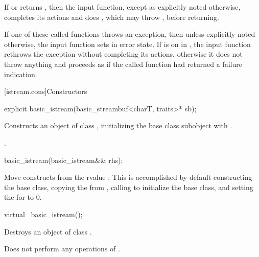 \pnum
If
or
returns
,
then the input function, except as explicitly noted otherwise, completes its actions and does
,
which may throw
, before returning.

\pnum
If one of these called functions throws an exception, then unless explicitly noted otherwise,
the input function sets
in error state.
If
is on in
,
the input function
rethrows the exception without completing its actions, otherwise
it does not throw anything and proceeds as if the called function had returned
a failure indication.

[istream.cons]{Constructors}

%
\begin{itemdecl}
explicit basic_istream(basic_streambuf<charT, traits>* sb);
\end{itemdecl}

%
\begin{itemdescr}
\pnum
\effects
Constructs an object of class
, initializing the base class subobject with
.

\pnum
\ensures
{}.
\end{itemdescr}


%
\begin{itemdecl}
basic_istream(basic_istream&& rhs);
\end{itemdecl}

\begin{itemdescr}
\pnum
\effects Move constructs from the rvalue .
This is accomplished by default constructing the base class, copying the
 from , calling
 to initialize the base
class, and setting the  for  to 0.
\end{itemdescr}

%
\begin{itemdecl}
virtual ~basic_istream();
\end{itemdecl}

\begin{itemdescr}
\pnum
\effects
Destroys an object of class
.

\pnum
\remarks
Does not perform any operations of
.
\end{itemdescr}

